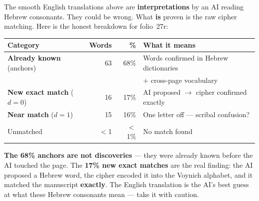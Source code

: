 \documentclass[11pt,a4paper]{article}
\begin{document}
\begin{tcolorbox}[title={\large Important: what is proven vs.\ what is interpreted},
  colframe=zero!70!black, colback=zero!5!white]

The smooth English translations above are \textbf{interpretations} by an AI
reading Hebrew consonants. They could be wrong. What \textbf{is} proven is the
raw cipher matching. Here is the honest breakdown for folio~27r:

\medskip
\begin{center}
\renewcommand{\arraystretch}{1.3}
\begin{tabular}{lrrl}
\toprule
\textbf{Category} & \textbf{Words} & \textbf{\%} & \textbf{What it means} \\
\midrule
\rowcolor{match!10}
\textbf{Already known} (anchors) & 63 & 68\% &
Words confirmed in Hebrew dictionaries \\
& & & + cross-page vocabulary \\[2pt]
\rowcolor{match!10}
\textbf{New exact match} ($d=0$) & 16 & 17\% &
AI proposed $\to$ cipher confirmed exactly \\[2pt]
\rowcolor{yellow!15}
\textbf{Near match} ($d=1$) & 15 & 16\% &
One letter off --- scribal confusion? \\[2pt]
\rowcolor{zero!5}
Unmatched & $<$1 & $<$1\% &
No match found \\
\bottomrule
\end{tabular}
\end{center}

\medskip
\noindent
\textbf{The 68\% anchors are not discoveries} --- they were already known
before the AI touched the page.
The \textbf{17\% new exact matches} are the real finding:
the AI proposed a Hebrew word, the cipher encoded it into
the Voynich alphabet, and it matched the manuscript \textbf{exactly}.
The English translation is the AI's best guess at what these
Hebrew consonants mean --- take it with caution.
\end{tcolorbox}

\medskip
\end{document}
